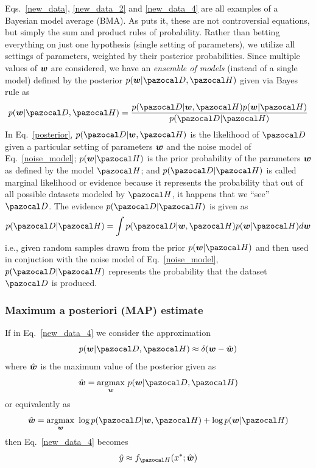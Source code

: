 Eqs.~\eqref{new_data}, \eqref{new_data_2} and \eqref{new_data_4} are all examples of a Bayesian model average (BMA). 
As \textcite{wilson2020bayesian} puts it, these are not controversial equations, but simply the sum and product rules of probability. 
Rather than betting everything on just one hypothesis (single setting of parameters), we utilize all settings of parameters, weighted by their posterior probabilities.
Since multiple values of $\boldsymbol{w}$ are considered, we have an \textit{ensemble of models} (instead of a single model) defined by the posterior $p(\bw|\cD,\cH)$ given via Bayes rule as
\begin{equation}\label{posterior}
p(\bw|\cD,\cH) =\frac{p(\cD|\bw,\cH)p(\bw|\cH)}{p(\cD|\cH)}
\end{equation}
In Eq.~\eqref{posterior}, $p(\cD|\bw,\cH)$ is the likelihood of $\cD$ given a particular setting of parameters $\boldsymbol{w}$ and the noise model of Eq.~\eqref{noise_model}; $p(\bw|\cH)$ is the prior probability of the parameters $\boldsymbol{w}$ as defined by the model $\cH$; and $p(\cD|\cH)$ is called marginal likelihood or evidence because it represents the probability that out of all possible datasets modeled by $\cH$, it happens that we ``see'' $\cD$.
The evidence $p(\cD|\cH)$ is given as 
\begin{equation}\label{}
p(\cD|\cH) =\int p(\cD|\bw,\cH)p(\bw|\cH) d\bw 
\end{equation}
i.e., given random samples drawn from the prior $p(\bw|\cH)$ and then used in conjuction with the noise model of Eq.~\eqref{noise_model}, $p(\cD|\cH)$ represents the probability that the dataset $\cD$ is produced.

\subsubsection{Maximum a posteriori (MAP) estimate}\label{sec:MAP}

If in Eq.~\eqref{new_data_4} we consider the approximation
\begin{equation}\label{map_p}
	p(\bw|\cD,\cH) \approx \delta(\bw-\hat{\bw})
\end{equation}
where $\hat{\boldsymbol{w}}$ is the maximum value of the posterior given as
\begin{equation}\label{map}
\hat{\bw} = \underset{\bw}{\mathrm{argmax}}~p(\bw|\cD,\cH)
\end{equation}
or equivalently as
\begin{equation}\label{map_2}
\hat{\bw} = \underset{\bw}{\mathrm{argmax}}~\log p(\cD|\bw,\cH) + \log p(\bw|\cH)
\end{equation}
then Eq.~\eqref{new_data_4} becomes
\begin{equation}\label{new_data_map}
\hat{y} \approx f_{\cH}(x^*;\hat{\bw})
\end{equation}

